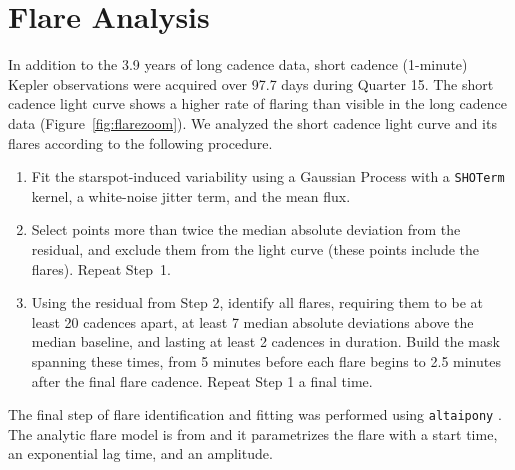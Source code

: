 \documentclass[12pt,modern,twocolumn,tighten]{aastex63}
\begin{document}
\section{Flare Analysis}
\label{app:flare}

In addition to the 3.9 years of long cadence data, short cadence
(1-minute) Kepler observations were acquired over 97.7 days during
Quarter 15.  The short cadence light curve shows a higher rate of
flaring than visible in the long cadence data
(Figure~\ref{fig:flarezoom}).  We analyzed the short cadence light
curve and its flares according to the following procedure.
\begin{enumerate}
  \item Fit the starspot-induced variability using a
    Gaussian Process with a \texttt{SHOTerm} kernel, a white-noise jitter term, and the
    mean flux.
  \item Select points more than twice the median absolute
    deviation from the residual, and exclude them from the light
    curve (these points include the flares).  Repeat Step~1.
  \item Using the residual from Step 2, identify all flares,
    requiring them to be at least 20 cadences apart, at least 7 median
    absolute deviations above the median baseline, and lasting at
    least 2 cadences in duration.  Build the mask spanning these
    times, from 5 minutes before each flare begins to 2.5 minutes
    after the final flare cadence.  Repeat Step 1 a final time.
\end{enumerate}
The final step of flare identification and fitting was performed using \texttt{altaipony}
\citep{davenport_2016,ilin_flares_2021}.  The analytic flare model is
from \citet{davenport_2014} and it parametrizes the flare with a start
time, an exponential lag time, and an amplitude.
\end{document}
